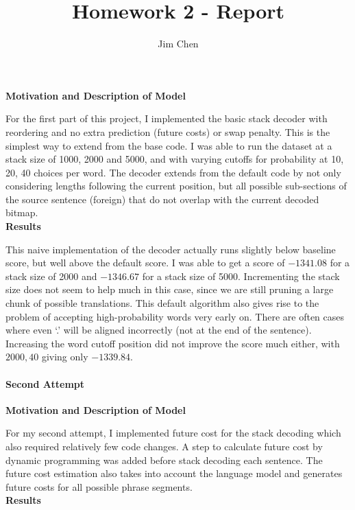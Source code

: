 \documentclass{article}
\title{Homework 2 - Report}
\author{Jim Chen}
\begin{document}
\thispagestyle{plain}\maketitle

{\bf Motivation and Description of Model} 

For the first part of this project, I implemented the basic stack decoder with reordering and no extra prediction (future costs) or swap penalty. This is the simplest way to extend from the base code. I was able to run the dataset at a stack size of 1000, 2000 and 5000, and with varying cutoffs for probability at 10, 20, 40 choices per word. The decoder extends from the default code by not only considering lengths following the current position, but all possible sub-sections of the source sentence (foreign) that do not overlap with the current decoded bitmap. \\

{\bf Results} 

This naive implementation of the decoder actually runs slightly below baseline score, but well above the default score. I was able to get a score of $-1341.08$ for a stack size of 2000 and $-1346.67$ for a stack size of 5000. Incrementing the stack size does not seem to help much in this case, since we are still pruning a large chunk of possible translations. This default algorithm also gives rise to the problem of accepting high-probability words very early on. There are often cases where even `.' will be aligned incorrectly (not at the end of the sentence). Increasing the word cutoff position did not improve the score much either, with $2000, 40$ giving only $-1339.84$. 

\paragraph{Second Attempt}
{\bf Motivation and Description of Model} 

For my second attempt, I implemented future cost for the stack decoding which also required relatively few code changes. A step to calculate future cost by dynamic programming was added before stack decoding each sentence. The future cost estimation also takes into account the language model and generates future costs for all possible phrase segments.\\


{\bf Results} 
\end{document}

